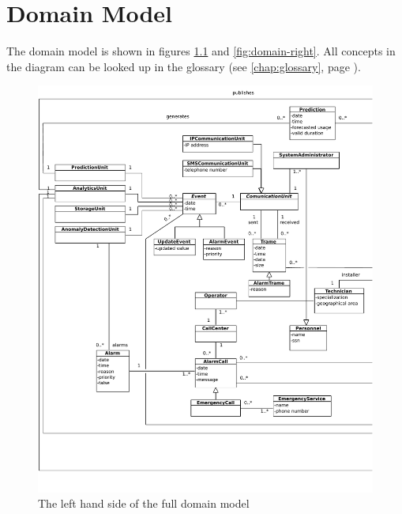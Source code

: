 \chapter{Domain Model}
\label{chap:domain-model}

\npar The domain model is shown in figures \ref{fig:domain-left} and
\ref{fig:domain-right}. All concepts in the diagram can be looked up in the glossary (see
\ref{chap:glossary}, page \pageref{chap:glossary}).

\begin{figure}[H]
	\begin{centering}
		\includegraphics[height=\textwidth]{figs/domain-model-left.pdf}
		\caption{The left hand side of the full domain model}
		\label{fig:domain-left}
	\end{centering}
\end{figure}

